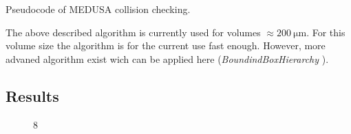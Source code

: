 % 
\begin{lstfloat}[!t]
	
	\caption{Pseudocode of \acs{MEDUSA} collision checking.}
	\label{alg:medusa_collision}
\end{lstfloat}
% 
The above described algorithm is currently used for volumes $\approx \SI{200}{\micro\meter}$. For this volume size the algorithm is for the current use fast enough. However, more advaned algorithm exist wich can be applied here (\eg \textit{BoundindBoxHierarchy} \cite{Karras2012}).
% 
\subsection{Results}
% 
\begin{figure}[!t]
    \centering
	\caption{8 \cite{Ginsburger2019}}
	\label{fig:medusa_8}
\end{figure}
% 
